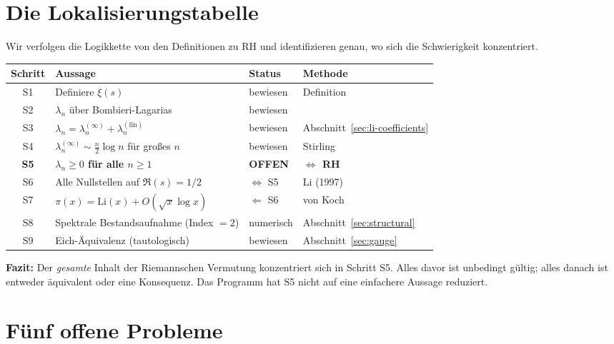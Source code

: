 \documentclass[12pt,a4paper]{article}
\theoremstyle{definition}
\theoremstyle{remark}
\begin{document}
\section{Die Lokalisierungstabelle}
\label{sec:localization}

Wir verfolgen die Logikkette von den Definitionen zu RH und identifizieren genau, wo sich die Schwierigkeit konzentriert.

\begin{center}
\renewcommand{\arraystretch}{1.2}
\begin{tabular}{c|l|l|l}
\textbf{Schritt} & \textbf{Aussage} & \textbf{Status} & \textbf{Methode} \\\hline
S1 & Definiere $\xi(s)$ & bewiesen & Definition \\
S2 & $\lambda_n$ über Bombieri-Lagarias & bewiesen & \cite{BombieriLagarias1999} \\
S3 & $\lambda_n = \lambda_n^{(\infty)} + \lambda_n^{(\mathrm{fin})}$ & bewiesen & Abschnitt~\ref{sec:li-coefficients} \\
S4 & $\lambda_n^{(\infty)} \sim \frac{n}{2}\log n$ für großes $n$ & bewiesen & Stirling \\
\textbf{S5} & \textbf{$\lambda_n \geq 0$ für alle $n \geq 1$} & \textbf{OFFEN} & \textbf{$\Longleftrightarrow$ RH} \\
S6 & Alle Nullstellen auf $\Re(s) = 1/2$ & $\Leftrightarrow$ S5 & Li (1997) \\
S7 & $\pi(x) = \mathrm{Li}(x) + O(\sqrt{x}\log x)$ & $\Leftarrow$ S6 & von Koch \\
S8 & Spektrale Bestandsaufnahme (Index $= 2$) & numerisch & Abschnitt~\ref{sec:structural} \\
S9 & Eich-Äquivalenz (tautologisch) & bewiesen & Abschnitt~\ref{sec:gauge} \\
\end{tabular}
\end{center}

\noindent\textbf{Fazit:} Der \emph{gesamte} Inhalt der Riemannschen Vermutung konzentriert sich in Schritt S5. Alles davor ist unbedingt gültig; alles danach ist entweder äquivalent oder eine Konsequenz. Das Programm hat S5 nicht auf eine einfachere Aussage reduziert.


\section{Fünf offene Probleme}
\label{sec:open-problems}
\end{document}
